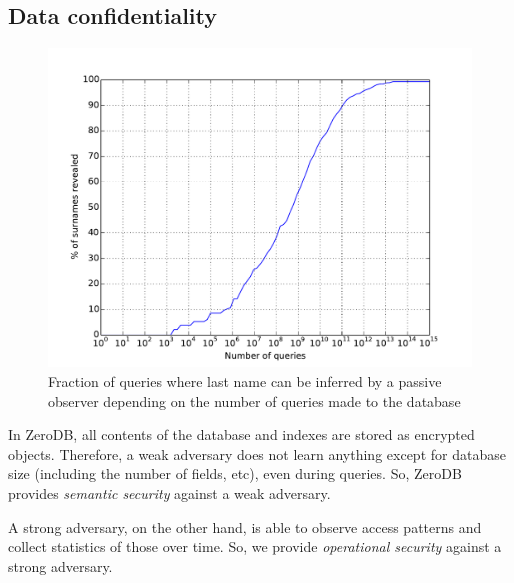 \documentclass[notitlepage,longbibliography]{revtex4-1}
\begin{document}
\subsection{Data confidentiality}

\begin{figure}
	\begin{center}
        \includegraphics[width=0.7\columnwidth]{surname-attack.pdf}
	\end{center}
    \caption{Fraction of queries where last name can be inferred by a passive observer depending on the number of queries made to the database}
	\label{fig:surname-attack}
\end{figure}

In ZeroDB, all contents of the database and indexes are stored as encrypted objects.
Therefore, a weak adversary does not learn anything except for database size (including the number of fields, etc), even during queries.
So, ZeroDB provides \emph{semantic security} against a weak adversary.

A strong adversary, on the other hand, is able to observe access patterns and collect statistics of those over time.
So, we provide \emph{operational security} against a strong adversary.
\end{document}
